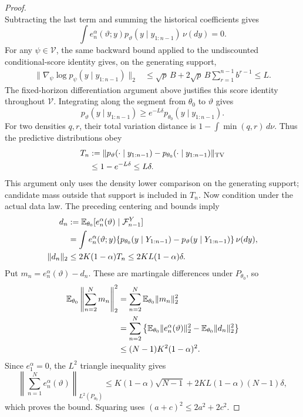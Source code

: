 \documentclass[11pt]{article}
\theoremstyle{thmstylethree}%
\begin{document}
\begin{proof}
{\[\]
Subtracting the last term and summing the historical coefficients gives
\[
\int e_n^\alpha(\vartheta;y)
 p_\vartheta(y\mid y_{1:n-1})\,\nu(dy)=0.
\]
\endgraf
For any $\psi\in\mathcal V$, the same backward bound applied to the
undiscounted conditional-score identity gives, on the generating support,
\begin{align}
\|\nabla_\psi\log p_\psi(y\mid y_{1:n-1})\|_2
&\leq\sqrt p\,B+2\sqrt p\,B\sum_{r=1}^{n-1}b^{r-1}
\leq L.
\label{eq:offtruth-predictive-score-bound}
\end{align}
The fixed-horizon differentiation argument above justifies this score
identity throughout $\mathcal V$. Integrating along the segment from
$\theta_0$ to $\vartheta$ gives
\[
p_\vartheta(y\mid y_{1:n-1})
\geq e^{-L\delta}p_{\theta_0}(y\mid y_{1:n-1}).
\]
For two densities $q,r$, their total variation distance is
$1-\int\min(q,r)\,d\nu$. Thus the predictive distributions obey
\begin{align}
T_n
&:=\|p_\vartheta(\cdot\mid y_{1:n-1})
      -p_{\theta_0}(\cdot\mid y_{1:n-1})\|_{\mathrm{TV}}\notag\\*
&\leq1-e^{-L\delta}\leq L\delta.
\label{eq:offtruth-predictive-tv}
\end{align}
This argument only uses the density lower comparison on the generating
support; candidate mass outside that support is included in $T_n$.
\endgraf
Now condition under the actual data law. The preceding centering and
bounds imply
\begin{align}
d_n&:=\mathbb{E}_{\theta_0}
 [e_n^\alpha(\vartheta)\mid\mathcal F_{n-1}^Y]\notag\\*
&=\int e_n^\alpha(\vartheta;y)
 \{p_{\theta_0}(y\mid Y_{1:n-1})
   -p_\vartheta(y\mid Y_{1:n-1})\}\,\nu(dy),\notag\\
\|d_n\|_2&\leq2K(1-\alpha)T_n
\leq2KL(1-\alpha)\delta.
\label{eq:offtruth-predictable-drift}
\end{align}
Put $m_n=e_n^\alpha(\vartheta)-d_n$. These are martingale differences
under $P_{\theta_0}$, so
\begin{align}
\mathbb{E}_{\theta_0}\left\|\sum_{n=2}^N m_n\right\|_2^2
&=\sum_{n=2}^N\mathbb{E}_{\theta_0}\|m_n\|_2^2\notag\\*
&=\sum_{n=2}^N\left\{
 \mathbb{E}_{\theta_0}\|e_n^\alpha(\vartheta)\|_2^2
 -\mathbb{E}_{\theta_0}\|d_n\|_2^2\right\}\notag\\*
&\leq(N-1)K^2(1-\alpha)^2.
\end{align}
Since $e_1^\alpha=0$, the $L^2$ triangle inequality gives
\[
\left\|\sum_{n=1}^N e_n^\alpha(\vartheta)\right\|_{L^2(P_{\theta_0})}
\leq K(1-\alpha)\sqrt{N-1}
   +2KL(1-\alpha)(N-1)\delta,
\]
which proves the bound. Squaring uses $(a+c)^2\leq2a^2+2c^2$.}
\end{proof}
\end{document}
